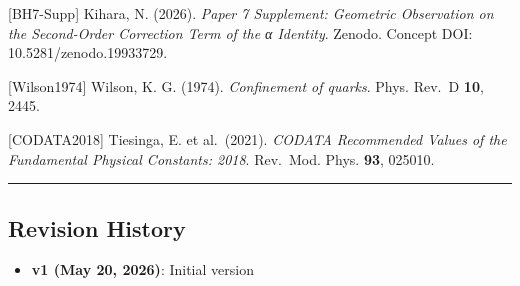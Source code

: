\documentclass[
  11pt]{article}
\providecommand{\tightlist}{%
  \setlength{\itemsep}{0pt}\setlength{\parskip}{0pt}}
\begin{document}
{[}BH7-Supp{]} Kihara, N. (2026). \emph{Paper 7 Supplement: Geometric
Observation on the Second-Order Correction Term of the α Identity}.
Zenodo. Concept DOI: 10.5281/zenodo.19933729.

{[}Wilson1974{]} Wilson, K. G. (1974). \emph{Confinement of quarks}.
Phys. Rev.~D \textbf{10}, 2445.

{[}CODATA2018{]} Tiesinga, E. et al.~(2021). \emph{CODATA Recommended
Values of the Fundamental Physical Constants: 2018}. Rev.~Mod. Phys.
\textbf{93}, 025010.

\begin{center}\rule{0.5\linewidth}{0.5pt}\end{center}

\subsection{Revision History}\label{revision-history}

\begin{itemize}
\tightlist
\item
  \textbf{v1 (May 20, 2026)}: Initial version
\end{itemize}
\end{document}
